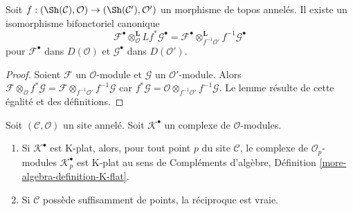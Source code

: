 \begin{lemma}
\label{lemma-variant-derived-pullback}
Soit $f : (\Sh(\mathcal{C}), \mathcal{O}) \to (\Sh(\mathcal{C}'), \mathcal{O}')$
un morphisme de topos annelés. Il existe un isomorphisme bifonctoriel
canonique
$$
\mathcal{F}^\bullet
\otimes_\mathcal{O}^{\mathbf{L}}
Lf^*\mathcal{G}^\bullet
=
\mathcal{F}^\bullet 
\otimes_{f^{-1}\mathcal{O}'}^{\mathbf{L}}
f^{-1}\mathcal{G}^\bullet 
$$
pour $\mathcal{F}^\bullet$ dans $D(\mathcal{O})$ et
$\mathcal{G}^\bullet$ dans $D(\mathcal{O}')$.
\end{lemma}

\begin{proof}
Soient $\mathcal{F}$ un $\mathcal{O}$-module et $\mathcal{G}$ un
$\mathcal{O}'$-module. Alors
$\mathcal{F} \otimes_{\mathcal{O}} f^*\mathcal{G} =
\mathcal{F} \otimes_{f^{-1}\mathcal{O}'} f^{-1}\mathcal{G}$
car
$f^*\mathcal{G} =
\mathcal{O} \otimes_{f^{-1}\mathcal{O}'} f^{-1}\mathcal{G}$.
Le lemme résulte de cette égalité et des définitions.
\end{proof}











\begin{lemma}
\label{lemma-check-K-flat-stalks}
Soit $(\mathcal{C}, \mathcal{O})$ un site annelé.
Soit $\mathcal{K}^\bullet$ un complexe de $\mathcal{O}$-modules.
\begin{enumerate}
\item Si $\mathcal{K}^\bullet$ est K-plat, alors, pour tout point $p$ du
site $\mathcal{C}$, le complexe de $\mathcal{O}_p$-modules
$\mathcal{K}_p^\bullet$ est K-plat au sens de
Compléments d'algèbre, Définition \ref{more-algebra-definition-K-flat}.
\item Si $\mathcal{C}$ possède suffisamment de points, la réciproque est
vraie.
\end{enumerate}
\end{lemma}

